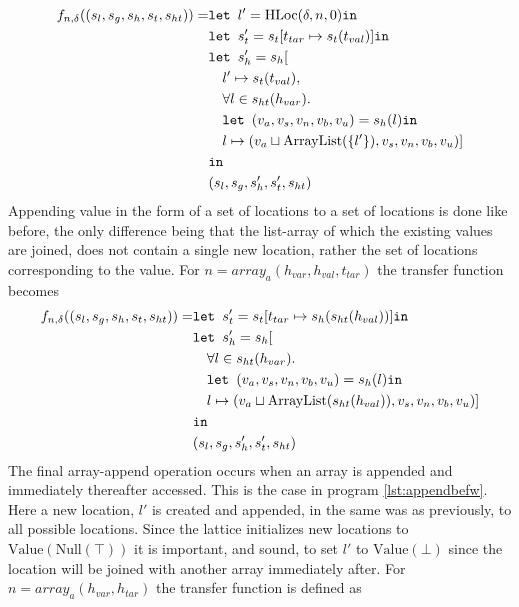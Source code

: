 \begin{align}
    f_{n,\delta}((s_l, s_g, s_h, s_t, s_{ht})) = &\texttt{let } l' = \text{HLoc}(\delta, n, 0) \texttt{in } \notag\\
                              &\texttt{let } s_t' = s_t[t_{tar}\mapsto s_t(t_{val})] \texttt{in }\notag\\
                              &\texttt{let } s_h' = s_h[\notag\\
                              &\quad l' \mapsto s_t(t_{val}), \notag\\
                              &\quad \forall l \in s_{ht}(h_{var}).\notag\\
                              &\quad\texttt{let } (v_a,v_s,v_n,v_b,v_u) = s_h(l) \texttt{in } \notag\\
                              &\quad l\mapsto (v_a \sqcup \text{ArrayList}(\{l'\}), v_s, v_n, v_b, v_u)]\notag\\
                              & \texttt{in }\notag\\
                              &(s_l, s_g, s_h', s_t', s_{ht})
\end{align}
Appending value in the form of a set of locations to a set of locations is done like before, the only difference being that the list-array of which the existing values are joined, does not contain a single new location, rather the set of locations corresponding to the value. For $n = \mathit{array}_a(h_{var}, h_{val},t_{tar})$ the transfer function becomes
\begin{align}
    f_{n,\delta}((s_l, s_g, s_h, s_t, s_{ht})) = &\texttt{let } s_t' = s_t[t_{tar}\mapsto s_h(s_{ht}(h_{val}))] \texttt{in }\notag\\
                              &\texttt{let } s_h' = s_h[\notag\\
                              &\quad \forall l \in s_{ht}(h_{var}).\notag\\
                              &\quad\texttt{let } (v_a,v_s,v_n,v_b,v_u) = s_h(l) \texttt{in } \notag\\
                              &\quad l\mapsto (v_a \sqcup \text{ArrayList}(s_{ht}(h_{val})), v_s, v_n, v_b, v_u)]\notag\\
                              & \texttt{in }\notag\\
                              &(s_l, s_g, s_h', s_t', s_{ht})
\end{align}
The final array-append operation occurs when an array is appended and immediately thereafter accessed. This is the case in program \ref{lst:appendbefw}. Here a new location, $l'$ is created and appended, in the same was as previously, to all possible locations. Since the lattice initializes new locations to $\text{Value}(\text{Null}(\top))$ it is important, and sound, to set $l'$ to $\text{Value}(\bot)$ since the location will be joined with another array immediately after. For $n = \mathit{array}_a(h_{var}, h_{tar})$ the transfer function is defined as
